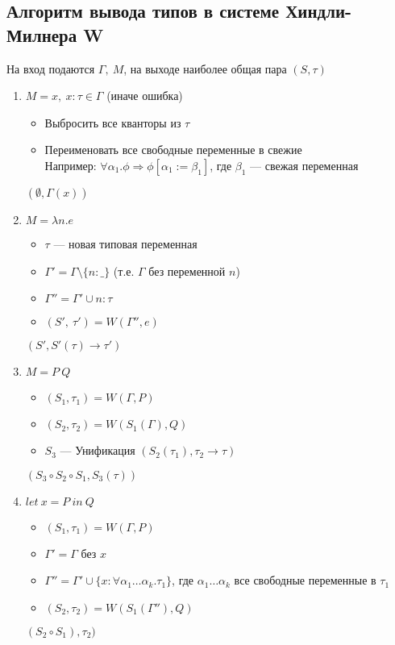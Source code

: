 \subsection{Алгоритм вывода типов в системе Хиндли-Милнера W}
На вход подаются $\Gamma,\ M$, на выходе наиболее общая пара $(S, \tau)$
\begin{enumerate}
    \item $M = x ,\ x:\tau  \in \Gamma$ (иначе ошибка)
    \begin{itemize}
        \item Выбросить все кванторы из $\tau$
        \item Переименовать все свободные переменные в свежие \\
        Например: $\forall \alpha_1.\phi \Rightarrow \phi[\alpha_1 := \beta_1]$, где $\beta_1$ --- свежая переменная
    \end{itemize}
    $(\emptyset, \Gamma(x))$
    \item $M = \lambda n.e$
    \begin{itemize}
        \item $\tau$ --- новая типовая переменная
        \item $\Gamma' = \Gamma \setminus \{n : \_ \}$ (т.е. $\Gamma$ без переменной $n$)
        \item $\Gamma'' = \Gamma' \cup {n : \tau}$
        \item $(S',\ \tau') = W(\Gamma'', e)$
    \end{itemize}
    $(S', S'(\tau) \rightarrow \tau')$
    \item $M = P\ Q$
    \begin{itemize}
        \item $(S_1, \tau_1) = W(\Gamma, P)$
        \item $(S_2, \tau_2) = W(S_1(\Gamma), Q)$
        \item $S_3$ --- Унификация $(S_2(\tau_1), \tau_2 \rightarrow \tau)$
    \end{itemize}
    $(S_3 \circ S_2 \circ S_1, S_3(\tau))$
    \item $let\ x = P\ in\ Q$
    \begin{itemize}
        \item $(S_1, \tau_1) = W(\Gamma, P)$
        \item $\Gamma' = \Gamma$ без $x$
        \item $\Gamma'' = \Gamma' \cup \{ x : \forall \alpha_1 \dots \alpha_k. \tau_1 \}$, где $\alpha_1 \dots \alpha_k$ все свободные переменные в $\tau_1$
        \item $(S_2, \tau_2) = W(S_1(\Gamma''), Q)$
    \end{itemize}
    $(S_2 \circ S_1), \tau_2)$
\end{enumerate}

